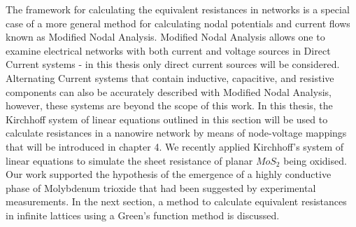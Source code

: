 The framework for calculating the equivalent resistances in networks is a special case of a more general method for calculating nodal potentials and current flows known as Modified Nodal Analysis\cite{strang1986}. Modified Nodal Analysis allows one to examine electrical networks with both current and voltage sources in Direct Current systems - in this thesis only direct current sources will be considered. Alternating Current systems that contain inductive, capacitive, and resistive components can also be accurately described with Modified Nodal Analysis\cite{strang1986}, however, these systems are beyond the scope of this work. In this thesis, the Kirchhoff system of linear equations outlined in this section will be used to calculate resistances in a nanowire network by means of node-voltage mappings that will be introduced in chapter 4. We recently applied Kirchhoff's system of linear equations to simulate the sheet resistance of planar $MoS_2$ being oxidised\cite{jadwiszczak2018}. Our work supported the hypothesis of the emergence of a highly conductive phase of Molybdenum trioxide that had been suggested by experimental measurements\cite{jadwiszczak2018}. In the next section, a method to calculate equivalent resistances in infinite lattices using a Green's function method is discussed.
